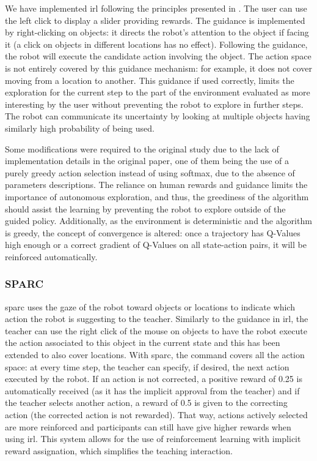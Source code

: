 We have implemented \gls{irl} following the principles presented in \cite{thomaz2008teachable}. The user can use the left click to display a slider providing rewards. The guidance is implemented by right-clicking on objects: it directs the robot's attention to the object if facing it (a click on objects in different locations has no effect). Following the guidance, the robot will execute the candidate action involving the object. The action space is not entirely covered by this guidance mechanism: for example, it does not cover moving from a location to another. This guidance if used correctly, limits the exploration for the current step to the part of the environment evaluated as more interesting by the user without preventing the robot to explore in further steps. The robot can communicate its uncertainty by looking at multiple objects having similarly high probability of being used. 

Some modifications were required to the original study due to the lack of implementation details in the original paper, one of them being the use of a purely greedy action selection instead of using softmax, due to the absence of parameters descriptions. The reliance on human rewards and guidance limits the importance of autonomous exploration, and thus, the greediness of the algorithm should assist the learning by preventing the robot to explore outside of the guided policy. Additionally, as the environment is deterministic and the algorithm is greedy, the concept of convergence is altered: once a trajectory has Q-Values high enough or a correct gradient of Q-Values on all state-action pairs, it will be reinforced automatically.

\subsubsection{SPARC}

\gls{sparc} uses the gaze of the robot toward objects or locations to indicate which action the robot is suggesting to the teacher. Similarly to the guidance in \gls{irl}, the teacher can use the right click of the mouse on objects to have the robot execute the action associated to this object in the current state and this has been extended to also cover locations. With \gls{sparc}, the command covers all the action space: at every time step, the teacher can specify, if desired, the next action executed by the robot. If an action is not corrected, a positive reward of 0.25 is automatically received (as it has the implicit approval from the teacher) and if the teacher selects another action, a reward of 0.5 is given to the correcting action (the corrected action is not rewarded). That way, actions actively selected are more reinforced and participants can still have give higher rewards when using \gls{irl}. This system allows for the use of reinforcement learning with implicit reward assignation, which simplifies the teaching interaction.



